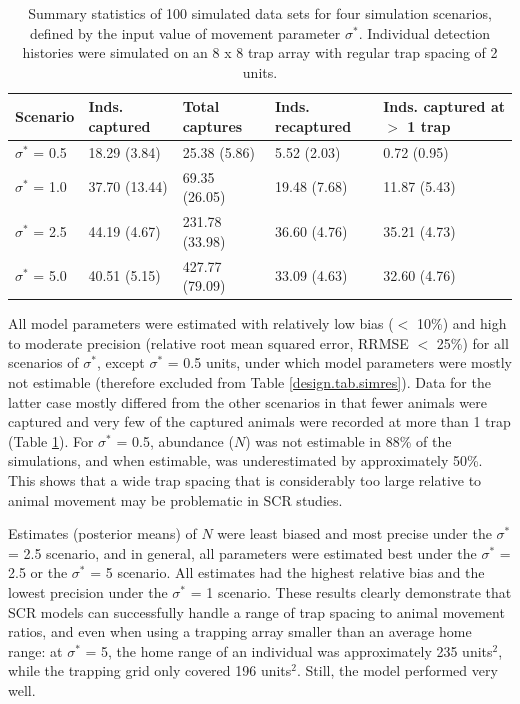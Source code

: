 \begin{table}[ht]
  \centering
  \caption{Summary statistics of 100 simulated data sets for four
    simulation scenarios, defined by the input value of movement
    parameter $\sigma^*$. Individual detection histories were
    simulated on an 8 x 8 trap array with regular trap spacing of 2
    units.}
    \begin{tabular}{l p{2.1cm} p{2.3cm}p{2.1cm}p{2.3cm}}
    \hline
    Scenario & Inds. \newline captured & Total \newline captures & Inds. \newline recaptured & Inds. captured  \newline at $>$ 1 trap \\ \hline
    {$\sigma^*$ = 0.5} & 18.29 (3.84) & 25.38 (5.86) & 5.52 (2.03) & 0.72 (0.95) \\
    {$\sigma^*$ = 1.0} & 37.70 (13.44) & 69.35 (26.05) & 19.48 (7.68) & 11.87 (5.43) \\
    {$\sigma^*$ = 2.5} & 44.19 (4.67) & 231.78 (33.98) & 36.60 (4.76) & 35.21 (4.73) \\
    {$\sigma^*$ = 5.0} & 40.51 (5.15) & 427.77 (79.09) & 33.09 (4.63)
    & 32.60 (4.76) \\ \hline
    \end{tabular}
  \label{design.tab.simdat}
\end{table}

All model parameters were
estimated with relatively
low bias ($<$ 10\%) and high to moderate precision (relative root
mean squared error, RRMSE $<$ 25\%)
for all scenarios of $\sigma^*$, except $\sigma^*$ = 0.5 units, under which model parameters were mostly not estimable 
(therefore excluded 
from Table \ref{design.tab.simres}). Data for the
latter case mostly differed from the other scenarios in that fewer
animals were captured and very few of the captured animals were
recorded at more than 1 trap (Table \ref{design.tab.simdat}). For
$\sigma^*$ = 0.5, abundance ($N$) was not
estimable 
in 88\% of the
simulations, and when estimable, was underestimated by
approximately 50\%. This shows that a wide trap spacing that is
considerably too large relative to animal movement may be problematic in SCR studies.

Estimates (posterior means)
of $N$ were least biased and most precise under the
$\sigma^*$ = 2.5 scenario, and in general, all parameters were
estimated best under the $\sigma^*$ = 2.5 or the $\sigma^*$ = 5
scenario. All estimates had the highest relative bias and the lowest
precision under the $\sigma^*$ = 1 scenario.  These results clearly
demonstrate that SCR models can successfully handle a range of trap
spacing to animal movement ratios, and even when using a trapping
array smaller than an average home range: at $\sigma^*$ = 5, the home
range of an individual was approximately 235 units$^2$, while the
trapping grid only covered 196 units$^2$. Still, the model performed
very well.

